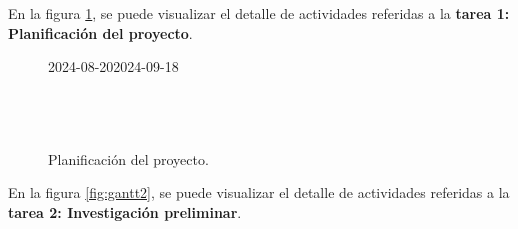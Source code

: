 En la figura \ref{fig:gantt1}, se puede visualizar el detalle de actividades
referidas a la \textbf{tarea 1: Planificación del proyecto}.

\begin{figure}[H]
	\begin{ganttchart}[
			time slot unit=day,
			time slot format=isodate,
			x unit=0.35cm, %
			y unit title=0.7cm, %
			y unit chart=0.7cm, %
			milestone/.append style={xscale=4},
			vgrid,
			hgrid,
		]{2024-08-20}{2024-09-18}
		 \\
		 \\
		 \\
		 \\
	\end{ganttchart}
	\caption{Planificación del proyecto.}

	\label{fig:gantt1}
\end{figure}

En la figura \ref{fig:gantt2}, se puede visualizar el detalle de actividades
referidas a la \textbf{tarea 2: Investigación preliminar}.

